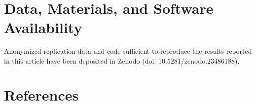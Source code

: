 \documentclass[9pt,twocolumn,twoside]{pnas-new}
\begin{document}
\showacknow{}
\vspace{0.5cm}
\section*{Data, Materials, and Software Availability}
Anonymized replication data and code sufficient to reproduce the results reported in this article have been deposited in Zenodo \citep{sun_sorin_suryadarma_rahut_resosudarmo_2026} (doi: 10.5281/zenodo.23486188).

\vspace{1cm}
\section*{References}




\end{document}
